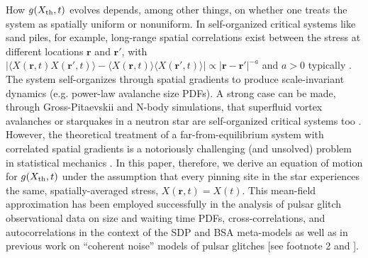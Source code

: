 How $g(X_{\rm th}, t)$ evolves depends, among other things, on whether one treats the system as spatially uniform or nonuniform. In self-organized critical systems like sand piles, for example, long-range spatial correlations exist between the stress at different locations $\mathbf{r}$ and $\mathbf{r'}$, with $|\langle X(\mathbf{r}, t) X(\mathbf{r'}, t)\rangle - \langle X(\mathbf{r}, t)\rangle \langle X(\mathbf{r'}, t)\rangle | \propto |\mathbf{r} - \mathbf{r'} |^{-a}$ and $a > 0$ typically \citep{Jensen1998, Aschwanden2018}. The system self-organizes through spatial gradients to produce scale-invariant dynamics (e.g. power-law avalanche size PDFs). A strong case can be made, through Gross-Pitaevskii and N-body simulations, that superfluid vortex avalanches or starquakes in a neutron star are self-organized critical systems too \citep{Melatos2008, Haskell2015, Howitt2020}. However, the theoretical treatment of a far-from-equilibrium system with correlated spatial gradients is a notoriously challenging (and unsolved) problem in statistical mechanics \citep{Jensen1998}. In this paper, therefore, we derive an equation of motion for $g(X_{\rm th}, t)$ under the assumption that every pinning site in the star experiences the same, spatially-averaged stress, $X(\mathbf{r},t) = X(t)$. This mean-field approximation \citep{Fulgenzi2017, Khomenko2018} has been employed successfully in the analysis of pulsar glitch observational data on size and waiting time PDFs, cross-correlations, and autocorrelations in the context of the SDP and BSA meta-models \citep{Fulgenzi2017, Melatos2018, Carlin2019quasi, Carlin2019ac, Carlin2020bsa, Melatos2019} as well as in previous work on ``coherent noise'' models of pulsar glitches [see footnote 2 and \citet{Melatos2009}].

